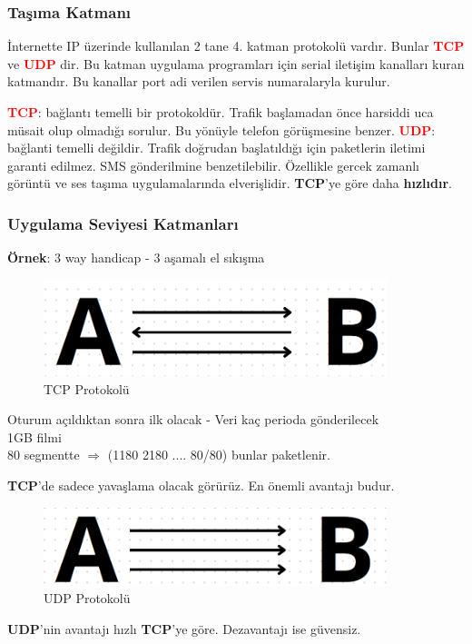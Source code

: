 \subsubsection{Taşıma Katmanı}
\tab İnternette IP üzerinde kullanılan 2 tane 4. katman protokolü vardır.
Bunlar \textcolor{red}{\textbf{TCP}} ve \textcolor{red}{\textbf{UDP}} dir.
Bu katman uygulama programları için serial iletişim kanalları kuran katmandır.
Bu kanallar port adi verilen servis numaralaryla kurulur.

\tab \textcolor{red}{\textbf{TCP}}: bağlantı temelli bir protokoldür.
Trafik başlamadan önce harsiddi uca müsait olup olmadığı sorulur.
Bu yönüyle telefon görüşmesine benzer.
\tab \textcolor{red}{\textbf{UDP}}: bağlanti temelli değildir.
Trafik doğrudan başlatıldığı için paketlerin iletimi garanti edilmez.
SMS gönderilmine benzetilebilir.
Özellikle gercek zamanlı görüntü ve ses taşıma uygulamalarında elverişlidir.
\textbf{TCP}'ye göre daha \textbf{hızlıdır}.

\subsubsection{Uygulama Seviyesi Katmanları}
\textbf{Örnek}: 3 way handicap - 3 aşamalı el sıkışma
\begin{figure}[!ht]
	\centering
	\includegraphics[width=10cm]{images/tcp_example}
	\caption{TCP Protokolü}
	\label{fig:tcp_example}
\end{figure}
Oturum açıldıktan sonra ilk olacak
- Veri kaç perioda gönderilecek \\
1GB filmi \\
80 segmentte $\Rightarrow$ (1180 2180 .... 80/80) bunlar paketlenir.

\textbf{TCP}'de sadece yavaşlama olacak görürüz.
En önemli avantajı budur.

\begin{figure}[!ht]
	\centering
	\includegraphics[width=10cm]{images/upd_example}
	\caption{UDP Protokolü}
	\label{fig:upd_example}
\end{figure}
\textbf{UDP}'nin avantajı hızlı  \textbf{TCP}'ye göre. Dezavantajı ise güvensiz.


